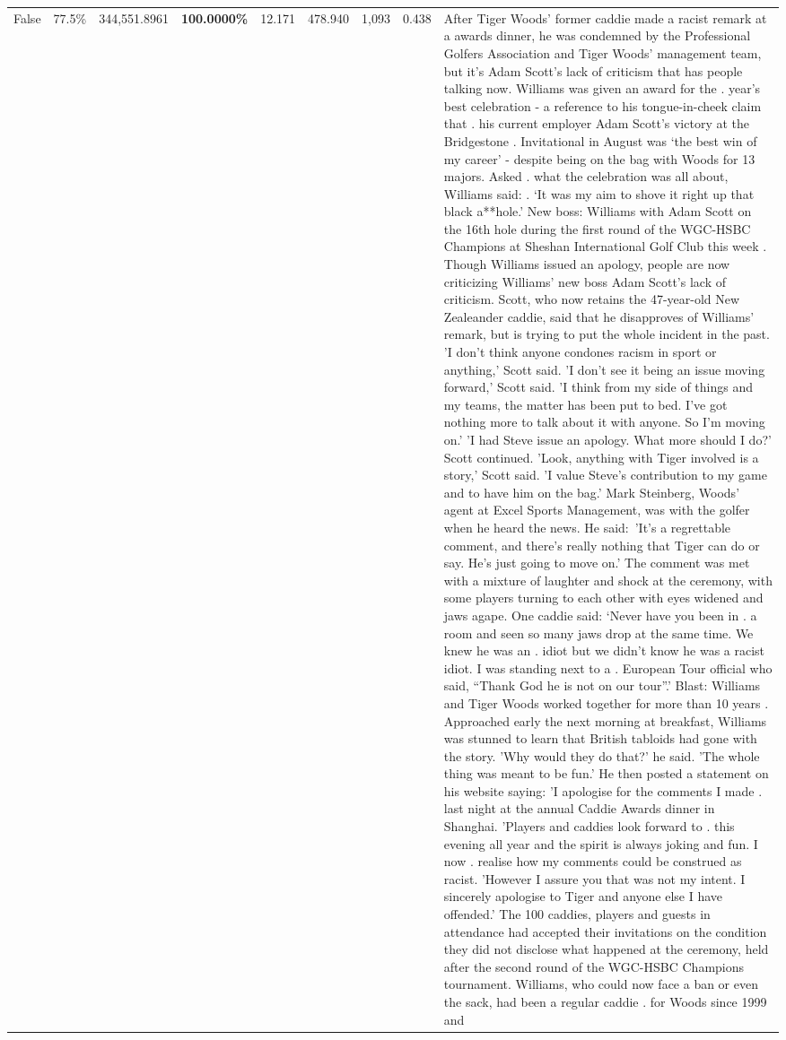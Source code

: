 \begin{table}[H]
\begin{tabular}{lllrlllll}
False & 77.5\% & 344,551.8961 & \bfseries \color{red} 100.0000\% & 12.171 & 478.940 & 1,093 & 0.438 & After Tiger Woods' former caddie made a racist remark at a awards dinner, he was condemned by the Professional Golfers Association and Tiger Woods' management team, but it's Adam Scott's lack of criticism that has people talking now. Williams was given an award for the . year’s best celebration - a reference to his tongue-in-cheek claim that . his current employer Adam Scott’s victory at the Bridgestone . Invitational in August was ‘the best win of my career’ - despite being on the bag with Woods for 13 majors. Asked . what the celebration was all about, Williams said: . ‘It was my aim to shove it right up that black a**hole.’ New boss: Williams with Adam Scott  on the 16th hole during the first round of the WGC-HSBC Champions at Sheshan International Golf Club this week . Though Williams issued an apology, people are now criticizing Williams' new boss Adam Scott's lack of criticism. Scott, who now retains the 47-year-old New Zealeander caddie, said that he disapproves of Williams' remark, but is trying to put the whole incident in the past. 'I don't think anyone condones racism in sport or anything,' Scott said. 'I don't see it being an issue moving forward,' Scott said. 'I think from my side of things and my teams, the matter has been put to bed. I've got nothing more to talk about it with anyone. So I'm moving on.' 'I had Steve issue an apology. What more should I do?' Scott continued. 'Look, anything with Tiger involved is a story,' Scott said. 'I value Steve's contribution to my game and to have him on the bag.' Mark Steinberg, Woods' agent at Excel Sports Management, was with the golfer when he heard the news. He said: 'It's a regrettable comment, and there's really nothing that Tiger can do or say. He's just going to move on.' The comment was met with a mixture of laughter and shock at the ceremony, with some players turning to each other with eyes widened and jaws agape. One caddie said: ‘Never have you been in . a room and seen so many jaws drop at the same time. We knew he was an . idiot but we didn’t know he was a racist idiot. I was standing next to a . European Tour official who said, “Thank God he is not on our tour”.’ Blast: Williams and Tiger Woods worked together for more than 10 years . Approached early the next morning at breakfast, Williams was stunned to learn that British tabloids had gone with the story. 'Why would they do that?' he said. 'The whole thing was meant to be fun.' He then posted a statement on his website saying: 'I apologise for the comments I made . last night at the annual Caddie Awards dinner in Shanghai. 'Players and caddies look forward to . this evening all year and the spirit is always joking and fun. I now . realise how my comments could be construed as racist. 'However I assure you that was not my intent. I sincerely apologise to Tiger and anyone else I have offended.' The 100 caddies, players and guests in attendance had accepted their invitations on the condition they did not disclose what happened at the ceremony, held after the second round of the WGC-HSBC Champions tournament. Williams, who could now face a ban or even the sack, had been a regular caddie . for Woods since 1999 and 
\end{tabular}
\end{table}
